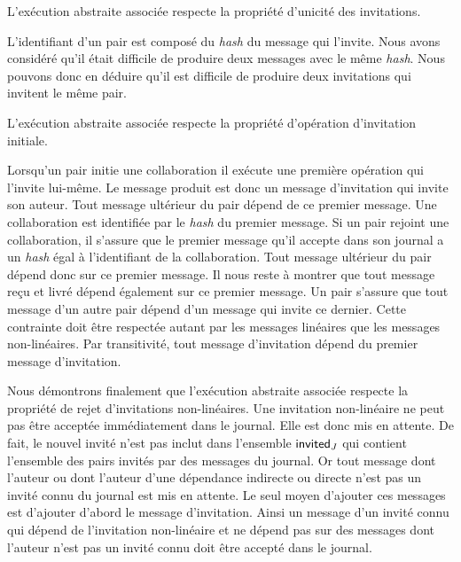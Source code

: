 L'exécution abstraite associée respecte la propriété d'unicité des invitations.

L'identifiant d'un pair est composé du \emph{hash} du message qui l'invite.
Nous avons considéré qu'il était difficile de produire deux messages avec le même \emph{hash}.
Nous pouvons donc en déduire qu'il est difficile de produire deux invitations qui invitent le même pair.

L'exécution abstraite associée respecte la propriété d'opération d'invitation initiale.

Lorsqu'un pair initie une collaboration il exécute une première opération qui l'invite lui-même.
Le message produit est donc un message d'invitation qui invite son auteur.
Tout message ultérieur du pair dépend de ce premier message.
Une collaboration est identifiée par le \emph{hash} du premier message.
Si un pair rejoint une collaboration, il s'assure que le premier message qu'il accepte dans son journal a un \emph{hash} égal à l'identifiant de la collaboration.
Tout message ultérieur du pair dépend donc sur ce premier message.
Il nous reste à montrer que tout message reçu et livré dépend également sur ce premier message.
Un pair s'assure que tout message d'un autre pair dépend d'un message qui invite ce dernier.
Cette contrainte doit être respectée autant par les messages linéaires que les messages non-linéaires.
Par transitivité, tout message d'invitation dépend du premier message d'invitation.

Nous démontrons finalement que l'exécution abstraite associée respecte la propriété de rejet d'invitations non-linéaires.
Une invitation non-linéaire ne peut pas être acceptée immédiatement dans le journal.
Elle est donc mis en attente.
De fait, le nouvel invité n'est pas inclut dans l'ensemble $\operatorname{\mathsf{invited}}_J$ qui contient l'ensemble des pairs invités par des messages du journal.
Or tout message dont l'auteur ou dont l'auteur d'une dépendance indirecte ou directe n'est pas un invité connu du journal est mis en attente.
Le seul moyen d'ajouter ces messages est d'ajouter d'abord le message d'invitation.
Ainsi un message d'un invité connu qui dépend de l'invitation non-linéaire et ne dépend pas sur des messages dont l'auteur n'est pas un invité connu doit être accepté dans le journal.


